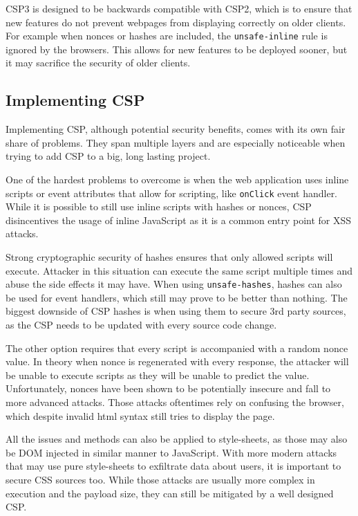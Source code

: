 CSP3 is designed to be backwards compatible with CSP2, which is to ensure that new features do not prevent webpages from displaying correctly on older clients.
For example when nonces or hashes are included, the \texttt{unsafe-inline} rule is ignored by the browsers.
This allows for new features to be deployed sooner, but it may sacrifice the security of older clients.


\subsection{Implementing CSP}
Implementing CSP, although potential security benefits, comes with its own fair share of problems. 
They span multiple layers and are especially noticeable when trying to add CSP to a big, long lasting project.

One of the hardest problems to overcome is when the web application uses inline scripts or event attributes that allow for scripting, like \texttt{onClick} event handler.
While it is possible to still use inline scripts with hashes or nonces, CSP disincentives the usage of inline JavaScript as it is a common entry point for XSS attacks. 

Strong cryptographic security of hashes ensures that only allowed scripts will execute. 
Attacker in this situation can execute the same script multiple times and abuse the side effects it may have.
When using \texttt{unsafe-hashes}, hashes can also be used for event handlers, which still may prove to be better than nothing.
The biggest downside of CSP hashes is when using them to secure 3rd party sources, as the CSP needs to be updated with every source code change.

The other option requires that every script is accompanied with a random nonce value.
In theory when nonce is regenerated with every response, the attacker will be unable to execute scripts as they will be unable to predict the value.
Unfortunately, nonces have been shown to be potentially insecure and fall to more advanced attacks. \cite{noncesGoBrrr}
Those attacks oftentimes rely on confusing the browser, which despite invalid html syntax still tries to display the page.

All the issues and methods can also be applied to style-sheets, as those may also be DOM injected in similar manner to JavaScript. \cite{cssinjection} \cite{cssexfil}
With more modern attacks that may use pure style-sheets to exfiltrate data about users, it is important to secure CSS sources too.
While those attacks are usually more complex in execution and the payload size, they can still be mitigated by a well designed CSP.

